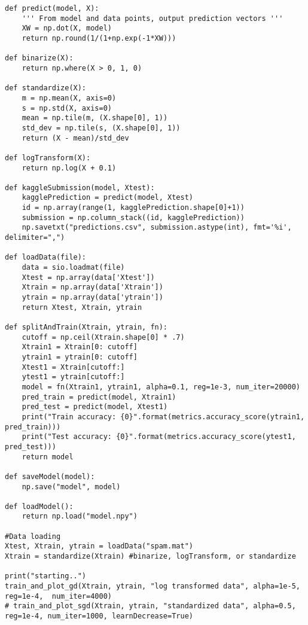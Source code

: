 \documentclass[11pt]{article}
\begin{document}
\begin{lstlisting}
def predict(model, X):
    ''' From model and data points, output prediction vectors '''
    XW = np.dot(X, model)
    return np.round(1/(1+np.exp(-1*XW)))

def binarize(X):
    return np.where(X > 0, 1, 0)

def standardize(X):
    m = np.mean(X, axis=0)
    s = np.std(X, axis=0)
    mean = np.tile(m, (X.shape[0], 1))
    std_dev = np.tile(s, (X.shape[0], 1))
    return (X - mean)/std_dev

def logTransform(X):
    return np.log(X + 0.1)

def kaggleSubmission(model, Xtest):
    kagglePrediction = predict(model, Xtest)
    id = np.array(range(1, kagglePrediction.shape[0]+1))
    submission = np.column_stack((id, kagglePrediction))
    np.savetxt("predictions.csv", submission.astype(int), fmt='%i', delimiter=",")

def loadData(file):
    data = sio.loadmat(file)
    Xtest = np.array(data['Xtest'])
    Xtrain = np.array(data['Xtrain'])
    ytrain = np.array(data['ytrain'])
    return Xtest, Xtrain, ytrain

def splitAndTrain(Xtrain, ytrain, fn):
    cutoff = np.ceil(Xtrain.shape[0] * .7)
    Xtrain1 = Xtrain[0: cutoff]
    ytrain1 = ytrain[0: cutoff]
    Xtest1 = Xtrain[cutoff:]
    ytest1 = ytrain[cutoff:]
    model = fn(Xtrain1, ytrain1, alpha=0.1, reg=1e-3, num_iter=20000)
    pred_train = predict(model, Xtrain1)
    pred_test = predict(model, Xtest1)
    print("Train accuracy: {0}".format(metrics.accuracy_score(ytrain1, pred_train)))
    print("Test accuracy: {0}".format(metrics.accuracy_score(ytest1, pred_test)))
    return model

def saveModel(model):
    np.save("model", model)

def loadModel():
    return np.load("model.npy")

#Data loading
Xtest, Xtrain, ytrain = loadData("spam.mat")
Xtrain = standardize(Xtrain) #binarize, logTransform, or standardize

print("starting..")
train_and_plot_gd(Xtrain, ytrain, "log transformed data", alpha=1e-5, reg=1e-4,  num_iter=4000)
# train_and_plot_sgd(Xtrain, ytrain, "standardized data", alpha=0.5, reg=1e-4, num_iter=1000, learnDecrease=True)


\end{lstlisting}
\end{document}
